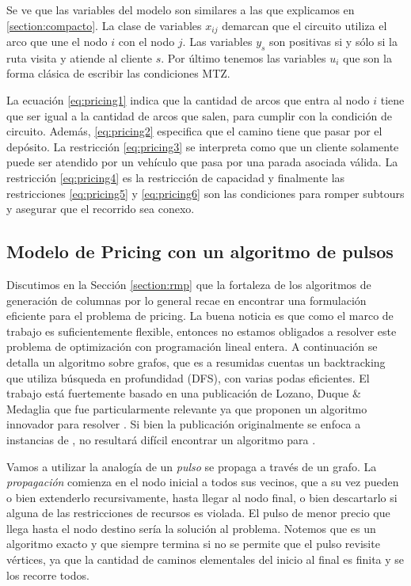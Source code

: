 Se ve que las variables del modelo son similares a las que explicamos en \ref{section:compacto}. La clase de variables $x_{ij}$ demarcan que el circuito utiliza el arco que une el nodo $i$ con el nodo $j$. Las variables $y_s$ son positivas si y sólo si la ruta visita y atiende al cliente $s$. Por último tenemos las variables $u_i$ que son la forma clásica de escribir las condiciones MTZ.

La ecuación \ref{eq:pricing1} indica que la cantidad de arcos que entra al nodo $i$ tiene que ser igual a la cantidad de arcos que salen, para cumplir con la condición de circuito. Además, \ref{eq:pricing2} especifica que el camino tiene que pasar por el depósito. La restricción \ref{eq:pricing3} se interpreta como que un cliente solamente puede ser atendido por un vehículo que pasa por una parada asociada válida. La restricción \ref{eq:pricing4} es la restricción de capacidad y finalmente las restricciones \ref{eq:pricing5} y \ref{eq:pricing6} son las condiciones para romper subtours y asegurar que el recorrido sea conexo.

\subsection{Modelo de Pricing con un algoritmo de pulsos}
\label{section:pricing-pulses}

Discutimos en la Sección \ref{section:rmp} que la fortaleza de los algoritmos de generación de columnas por lo general recae en encontrar una formulación eficiente para el problema de pricing. La buena noticia es que como el marco de trabajo es suficientemente flexible, entonces no estamos obligados a resolver este problema de optimización con programación lineal entera. A continuación se detalla un algoritmo sobre grafos, que es a resumidas cuentas un backtracking que utiliza búsqueda en profundidad (DFS), con varias podas eficientes. El trabajo está fuertemente basado en una publicación de Lozano, Duque \& Medaglia \cite{lozano-duque-medaglia} que fue particularmente relevante ya que proponen un algoritmo innovador para resolver . Si bien la publicación originalmente se enfoca a instancias de , no resultará difícil encontrar un algoritmo para .

Vamos a utilizar la analogía de un \emph{pulso} se propaga a través de un grafo. La \emph{propagación} comienza en el nodo inicial a todos sus vecinos, que a su vez pueden o bien extenderlo recursivamente, hasta llegar al nodo final, o bien descartarlo si alguna de las restricciones de recursos es violada. El pulso de menor precio que llega hasta el nodo destino sería la solución al problema. Notemos que es un algoritmo exacto y que siempre termina si no se permite que el pulso revisite vértices, ya que la cantidad de caminos elementales del inicio al final es finita y se los recorre todos. 

